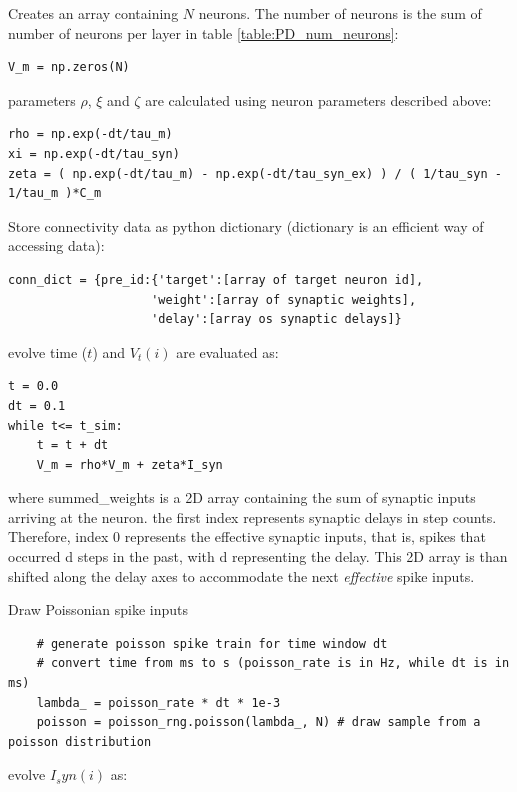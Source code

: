 \documentclass[11pt]{scrartcl}
\begin{document}
\begin{enumerate}
    \item Creates an array containing $N$ neurons. The number of neurons is the sum of number of neurons per layer in table \ref{table:PD_num_neurons}:
\begin{verbatim}
V_m = np.zeros(N)
\end{verbatim}
    \item parameters $\rho$, $\xi$ and $\zeta$ are calculated using neuron parameters described above:
\begin{verbatim}
rho = np.exp(-dt/tau_m)
xi = np.exp(-dt/tau_syn)
zeta = ( np.exp(-dt/tau_m) - np.exp(-dt/tau_syn_ex) ) / ( 1/tau_syn - 1/tau_m )*C_m
\end{verbatim}
Store connectivity data as python dictionary (dictionary is an efficient way of accessing data):
\begin{verbatim}
conn_dict = {pre_id:{'target':[array of target neuron id],
                    'weight':[array of synaptic weights],
                    'delay':[array os synaptic delays]}
\end{verbatim}
    \item evolve time ($t$) and $V_t(i)$ are evaluated as:
\begin{verbatim}
t = 0.0
dt = 0.1
while t<= t_sim:
    t = t + dt
    V_m = rho*V_m + zeta*I_syn
\end{verbatim}
where summed\_weights is a 2D array containing the sum of synaptic inputs arriving at the neuron. the first index represents synaptic delays in step counts. Therefore, index 0 represents the effective synaptic inputs, that is, spikes that occurred d steps in the past, with d representing the delay. This 2D array is than shifted along the delay axes to accommodate the next \textit{effective} spike inputs.
{\color{blue}
    \item Draw Poissonian spike inputs
    \begin{verbatim}
    # generate poisson spike train for time window dt
    # convert time from ms to s (poisson_rate is in Hz, while dt is in ms)
    lambda_ = poisson_rate * dt * 1e-3
    poisson = poisson_rng.poisson(lambda_, N) # draw sample from a poisson distribution
\end{verbatim}
}
    \item evolve $I_syn(i)$ as:

\end{enumerate}
\end{document}
